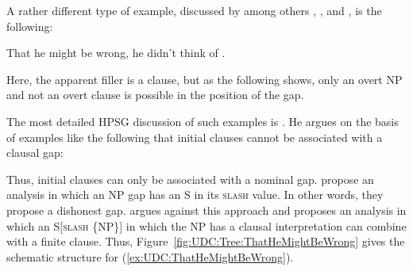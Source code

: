 \documentclass[output=paper
                ,modfonts
                ,nonflat
	        ,collection
	        ,collectionchapter
	        ,collectiontoclongg
 	        ,biblatex
                ,babelshorthands
                ,newtxmath
                ,draftmode
                ,colorlinks, citecolor=brown
]{./langsci/langscibook}
\begin{document}
{A rather different type of example, discussed by among others
\citet{Bresnan01}, \citet{Bouma:Malouf:Sag:01}, and \citet{Webelhuth:12},
is the following:

\begin{exe}
\ex  \label{ex:UDC:ThatHeMightBeWrong}  That he might be wrong, he didn't think of \gap{}.
\end{exe}

\noindent
Here, the apparent filler is a clause, but as the following shows, only
an overt NP and not an overt clause is possible in the position of the
gap.

\begin{exe}
\ex
\begin{xlist}
\end{xlist}
\end{exe}

\noindent
The most detailed HPSG discussion of such examples is \citet{Webelhuth:12}.
He argues on the basis of examples like the following that initial
clauses cannot be associated with a clausal gap:

\begin{exe} \ex \begin{xlist} 
\end{xlist}
\end{exe}

\begin{exe} \ex \begin{xlist} 
\end{xlist}
\end{exe}

\begin{exe} \ex \begin{xlist} 
\end{xlist}
\end{exe}

\noindent
Thus, initial clauses can only be associated with a nominal
gap. \citet[25--26]{Bouma:Malouf:Sag:01} propose an analysis in which
an NP gap has an S in its \textsc{slash} value. In other words, they propose a
dishonest gap.  \citet{Webelhuth:12} argues against this approach and
proposes an analysis in which an S{[}\textsc{slash} \{NP\}{]} in which the NP
has a clausal interpretation can combine with a finite clause. Thus,
Figure~\ref{fig:UDC:Tree:ThatHeMightBeWrong} gives the schematic
structure for (\ref{ex:UDC:ThatHeMightBeWrong}).

}
\end{document}

